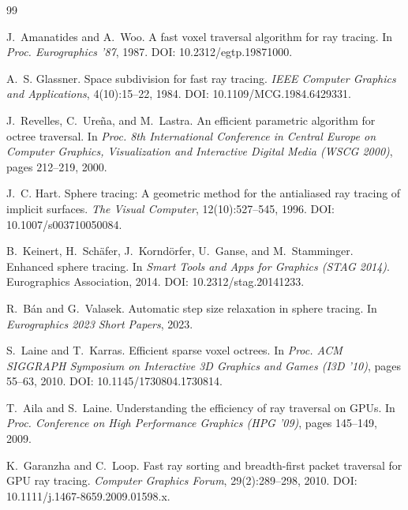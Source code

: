 \documentclass[11pt,a4paper]{article}
\theoremstyle{plain}
\theoremstyle{definition}
\theoremstyle{remark}
\begin{document}
\begin{thebibliography}{99}
\small

J.~Amanatides and A.~Woo.
\newblock A fast voxel traversal algorithm for ray tracing.
\newblock In \emph{Proc. Eurographics '87}, 1987.
\newblock DOI: 10.2312/egtp.19871000.

A.~S. Glassner.
\newblock Space subdivision for fast ray tracing.
\newblock \emph{IEEE Computer Graphics and Applications}, 4(10):15--22, 1984.
\newblock DOI: 10.1109/MCG.1984.6429331.

J.~Revelles, C.~Ure\~na, and M.~Lastra.
\newblock An efficient parametric algorithm for octree traversal.
\newblock In \emph{Proc. 8th International Conference in Central Europe on
Computer Graphics, Visualization and Interactive Digital Media (WSCG 2000)},
pages 212--219, 2000.

J.~C. Hart.
\newblock Sphere tracing: A geometric method for the antialiased ray tracing of
implicit surfaces.
\newblock \emph{The Visual Computer}, 12(10):527--545, 1996.
\newblock DOI: 10.1007/s003710050084.

B.~Keinert, H.~Sch\"afer, J.~Kornd\"orfer, U.~Ganse, and M.~Stamminger.
\newblock Enhanced sphere tracing.
\newblock In \emph{Smart Tools and Apps for Graphics (STAG 2014)}.
\newblock Eurographics Association, 2014.
\newblock DOI: 10.2312/stag.20141233.

R.~B\'an and G.~Valasek.
\newblock Automatic step size relaxation in sphere tracing.
\newblock In \emph{Eurographics 2023 Short Papers}, 2023.

S.~Laine and T.~Karras.
\newblock Efficient sparse voxel octrees.
\newblock In \emph{Proc. ACM SIGGRAPH Symposium on Interactive 3D Graphics and
Games (I3D '10)}, pages 55--63, 2010.
\newblock DOI: 10.1145/1730804.1730814.

T.~Aila and S.~Laine.
\newblock Understanding the efficiency of ray traversal on GPUs.
\newblock In \emph{Proc. Conference on High Performance Graphics (HPG '09)},
pages 145--149, 2009.

K.~Garanzha and C.~Loop.
\newblock Fast ray sorting and breadth-first packet traversal for GPU ray
tracing.
\newblock \emph{Computer Graphics Forum}, 29(2):289--298, 2010.
\newblock DOI: 10.1111/j.1467-8659.2009.01598.x.


\end{thebibliography}
\end{document}
